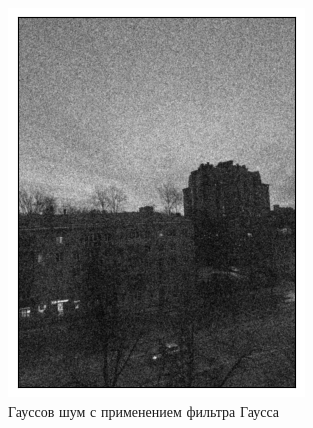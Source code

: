\documentclass[a4paper,12pt]{article}
\begin{document}
\begin{figure}[H]
    \begin{minipage}{0.49\textwidth}
        \centering \includegraphics[width=\textwidth]{results/lpf_gaus_5.png}
        \caption{Гауссов шум с применением фильтра Гаусса}
    \end{minipage}\hfill
    \begin{minipage}{0.49\textwidth}

\end{minipage}
\end{figure}
\end{document}
